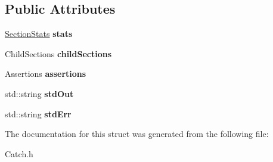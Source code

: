 \subsection*{Public Attributes}
\begin{DoxyCompactItemize}
\item 
\hypertarget{struct_catch_1_1_cumulative_reporter_base_1_1_section_node_ace54e2e5f29aad1484bfe501478ef686}{\hyperlink{struct_catch_1_1_section_stats}{Section\-Stats} {\bfseries stats}}\label{struct_catch_1_1_cumulative_reporter_base_1_1_section_node_ace54e2e5f29aad1484bfe501478ef686}

\item 
\hypertarget{struct_catch_1_1_cumulative_reporter_base_1_1_section_node_a755985897fd2694f9589858050a6cf38}{Child\-Sections {\bfseries child\-Sections}}\label{struct_catch_1_1_cumulative_reporter_base_1_1_section_node_a755985897fd2694f9589858050a6cf38}

\item 
\hypertarget{struct_catch_1_1_cumulative_reporter_base_1_1_section_node_a23ea83087a7036ad79e822534cfc5b25}{Assertions {\bfseries assertions}}\label{struct_catch_1_1_cumulative_reporter_base_1_1_section_node_a23ea83087a7036ad79e822534cfc5b25}

\item 
\hypertarget{struct_catch_1_1_cumulative_reporter_base_1_1_section_node_afc6a8c08567d60bb612133632d2992a3}{std\-::string {\bfseries std\-Out}}\label{struct_catch_1_1_cumulative_reporter_base_1_1_section_node_afc6a8c08567d60bb612133632d2992a3}

\item 
\hypertarget{struct_catch_1_1_cumulative_reporter_base_1_1_section_node_ae8e8c7ef27b55ef96d0f15af231fdfb8}{std\-::string {\bfseries std\-Err}}\label{struct_catch_1_1_cumulative_reporter_base_1_1_section_node_ae8e8c7ef27b55ef96d0f15af231fdfb8}

\end{DoxyCompactItemize}


The documentation for this struct was generated from the following file\-:\begin{DoxyCompactItemize}
\item 
Catch.\-h\end{DoxyCompactItemize}
